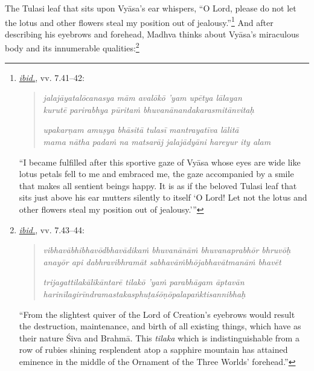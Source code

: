  The Tulasi leaf that sits upon Vyāsa’s ear whispers, “O Lord, please do not let the lotus and other flowers steal my position out of jealousy.”\footnote{%
\hyperref[NarayanaPandita2017]{\emph{ibid.}}, vv. 7.41–42:\setlength{\parindent}{2em}

\vspace{-1.5ex}\begin{quote}\raggedright
      \emph{jalajāyatalōcanasya mām avalōkō ’yam upētya lālayan}\\
\emph{kurutē parirabhya pūritaṁ bhuvanānandakarasmitānvitaḥ}

\emph{upakarṇam amuṣya bhāsitā tulasī mantrayatīva lālitā}\\
\emph{mama nātha padaṁ na matsarāj jalajādyāni hareyur ity alam}\end{quote}\vspace{-1.5ex}
      

\noindent{}“I became fulfilled after this sportive gaze of Vyāsa  \Dash  whose eyes are wide like lotus petals  \Dash  fell to me and embraced me, the gaze accompanied by a smile that makes all sentient beings happy. It is as if the beloved Tulasi leaf that sits just above his ear mutters silently to itself  \Dash  ‘O Lord! Let not the lotus and other flowers steal my position out of jealousy.’”
}
 And after describing his eyebrows and forehead, Madhva thinks about Vyāsa’s miraculous body and its innumerable qualities:\footnote{%
\hyperref[NarayanaPandita2017]{\emph{ibid.}}, vv. 7.43–44:\setlength{\parindent}{2em}

\vspace{-1.5ex}\begin{quote}\raggedright
      \emph{vibhavābhibhavōdbhavādikaṁ bhuvanānāṁ bhuvanaprabhōr bhruvōḥ}\\
\emph{anayōr api dabhravibhramāt sabhavāṁbhōjabhavātmanāṁ bhavēt}

\emph{trijagattilakālikāntarē tilakō ’yaṁ parabhāgam āptavān}\\
\emph{harinīlagirīndramastakasphuṭaśōṇōpalapaṅktisannibhaḥ}\end{quote}\vspace{-1.5ex}
      

\noindent{}“From the slightest quiver of the Lord of Creation’s eyebrows would result the destruction, maintenance, and birth of all existing things, which have as their nature Śiva and Brahmā. This \emph{tilaka}  \Dash  which is indistinguishable from a row of rubies shining resplendent atop a sapphire mountain  \Dash  has attained eminence in the middle of the Ornament of the Three Worlds’ forehead.”
}


